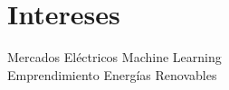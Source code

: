 \section{Intereses \faBook}
Mercados Eléctricos \textbullet{} Machine Learning\\ 
Emprendimiento \textbullet{} Energías Renovables
\sectionsep
